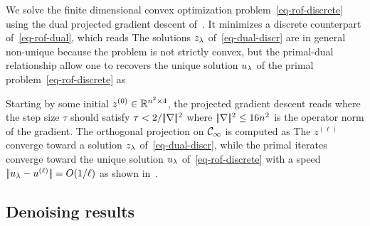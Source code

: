 We solve the finite dimensional convex optimization problem~\eqref{eq-rof-discrete} using the dual projected gradient descent of~\cite{chambolle2004algorithm}. 
%
It minimizes a discrete counterpart of~\eqref{eq-rof-dual}, which reads
The solutions $z_\lambda$ of~\eqref{eq-dual-discr} are in general non-unique because the problem is not strictly convex, but the primal-dual relationship allow one to recovers the unique solution $u_\lambda$ of the primal problem~\eqref{eq-rof-discrete} as

Starting by some initial $z^{(0)} \in \mathbb{R}^{n^2 \times 4}$, the projected gradient descent reads
where the step size $\tau$ should satisfy $\tau < 2/|\!| \nabla |\!|^2$ where $|\!| \nabla |\!|^2 \le 16 n^2$ %
 is the operator norm of the gradient. 
%
The orthogonal projection on $\mathcal{C}_\infty$ is computed as
%
The $z^{(\ell)} $ converge  toward a solution $z_{\lambda}$ of~\eqref{eq-dual-discr}, while the primal iterates
converge toward the unique solution $u_\lambda$ of~\eqref{eq-rof-discrete} with a speed $|\!| u_\lambda-u^{(\ell)} |\!| = O(1/\ell)$ as shown in~\cite{fadili2010tv}.

 


\subsection{Denoising results}

